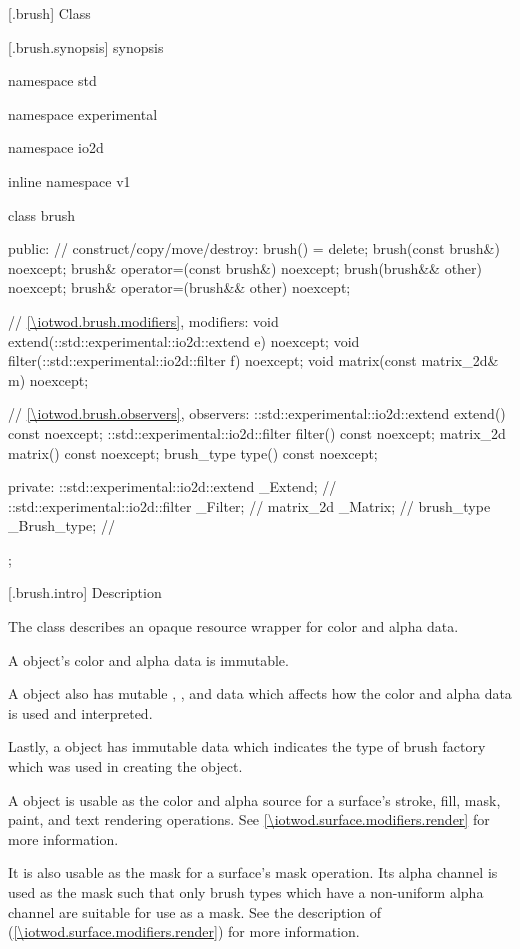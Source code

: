  [\iotwod.brush] {Class }

 [\iotwod.brush.synopsis] { synopsis}

\begin{codeblock}
namespace std { namespace experimental { namespace io2d { inline namespace v1 {
  class brush {
  public:
    // construct/copy/move/destroy:
    brush() = delete;
    brush(const brush&) noexcept;
    brush& operator=(const brush&) noexcept;
    brush(brush&& other) noexcept;
    brush& operator=(brush&& other) noexcept;

    // \ref{\iotwod.brush.modifiers}, modifiers:
    void extend(::std::experimental::io2d::extend e) noexcept;
    void filter(::std::experimental::io2d::filter f) noexcept;
    void matrix(const matrix_2d& m) noexcept;

    // \ref{\iotwod.brush.observers}, observers:
    ::std::experimental::io2d::extend extend() const noexcept;
    ::std::experimental::io2d::filter filter() const noexcept;
    matrix_2d matrix() const noexcept;
    brush_type type() const noexcept;

  private:
    ::std::experimental::io2d::extend _Extend; // \expos
    ::std::experimental::io2d::filter _Filter; // \expos
    matrix_2d _Matrix;                         // \expos
    brush_type _Brush_type;                    // \expos
  };
} } } }
\end{codeblock}

 [\iotwod.brush.intro] { Description}

\pnum
{}
The class  describes an opaque resource wrapper for color and alpha data.

\pnum
A  object's color and alpha data is immutable.

\pnum
A  object also has mutable , , and  data which affects how the color and alpha data is used and interpreted.

\pnum
Lastly, a  object has immutable  data which indicates the type of brush factory which was used in creating the  object.

\pnum
A  object is usable as the color and alpha source for a surface's stroke, fill, mask, paint, and text rendering operations. See \ref{\iotwod.surface.modifiers.render} for more information.

\pnum
It is also usable as the mask for a surface's mask operation. Its alpha channel is used as the mask such that only brush types which have a non-uniform alpha channel are suitable for use as a mask. See the description of  (\ref{\iotwod.surface.modifiers.render}) for more information.

